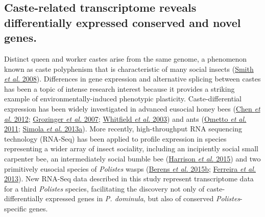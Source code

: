 \subsection{Caste-related transcriptome reveals differentially expressed
conserved and novel genes.} Distinct queen and worker castes arise from
the same genome, a phenomenon known as caste polyphenism that is
characteristic of many social insects
(\protect\hyperlink{ux5fENREFux5f56}{Smith \textit{et al.} 2008}).
Differences in gene expression and alternative splicing between castes
has been a topic of intense research interest because it provides a
striking example of environmentally-induced phenotypic plasticity.
Caste-differential expression has been widely investigated in advanced
eusocial honey bees (\protect\hyperlink{ux5fENREFux5f8}{Chen \textit{et
al.} 2012}; \protect\hyperlink{ux5fENREFux5f16}{Grozinger \textit{et al.}
2007}; \protect\hyperlink{ux5fENREFux5f72}{Whitfield \textit{et al.}
2003}) and ants (\protect\hyperlink{ux5fENREFux5f39}{Ometto \textit{et
al.} 2011}; \protect\hyperlink{ux5fENREFux5f52}{Simola \textit{et al.}
2013a}). More recently, high-throughput RNA sequencing technology
(RNA-Seq) has been applied to profile expression in species representing
a wider array of insect sociality, including an incipiently social small
carpenter bee, an intermediately social bumble bee
(\protect\hyperlink{ux5fENREFux5f18}{Harrison \textit{et al.} 2015}) and
two primitively eusocial species of \textit{Polistes} wasps
(\protect\hyperlink{ux5fENREFux5f3}{Berens \textit{et al.} 2015b};
\protect\hyperlink{ux5fENREFux5f10}{Ferreira \textit{et al.} 2013}). New
RNA-Seq data described in this study represent transcriptome data for a
third \textit{Polistes} species, facilitating the discovery not only of
caste-differentially expressed genes in \textit{P. dominula}, but also of
conserved \textit{Polistes}-specific genes.

